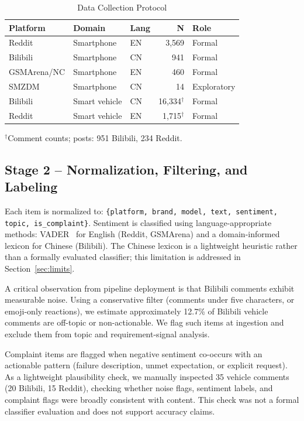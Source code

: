\documentclass[conference]{IEEEtran}
\begin{document}
\begin{table}[htb]
\caption{Data Collection Protocol}
\label{tab:collection}
\centering\small
\begin{tabular}{lllrl}
\toprule
Platform & Domain & Lang & N & Role \\
\midrule
Reddit       & Smartphone    & EN & 3,569  & Formal \\
Bilibili     & Smartphone    & CN & 941    & Formal \\
GSMArena/NC  & Smartphone    & EN & 460    & Formal \\
SMZDM        & Smartphone    & CN & 14     & Exploratory \\
Bilibili     & Smart vehicle & CN & 16,334$^\dagger$ & Formal \\
Reddit       & Smart vehicle & EN & 1,715$^\dagger$  & Formal \\
\bottomrule
\end{tabular}
\par\smallskip\footnotesize
$^\dagger$Comment counts; posts: 951 Bilibili, 234 Reddit.
\end{table}

\subsection{Stage 2 -- Normalization, Filtering, and Labeling}

Each item is normalized to: \texttt{\{platform, brand, model, text, sentiment, topic, is\_complaint\}}. Sentiment is classified using language-appropriate methods: VADER~\cite{Hutto2014} for English (Reddit, GSMArena) and a domain-informed lexicon for Chinese (Bilibili). The Chinese lexicon is a lightweight heuristic rather than a formally evaluated classifier; this limitation is addressed in Section~\ref{sec:limits}.

A critical observation from pipeline deployment is that Bilibili comments exhibit measurable noise. Using a conservative filter (comments under five characters, or emoji-only reactions), we estimate approximately 12.7\% of Bilibili vehicle comments are off-topic or non-actionable. We flag such items at ingestion and exclude them from topic and requirement-signal analysis.

Complaint items are flagged when negative sentiment co-occurs with an actionable pattern (failure description, unmet expectation, or explicit request). As a lightweight plausibility check, we manually inspected 35 vehicle comments (20 Bilibili, 15 Reddit), checking whether noise flags, sentiment labels, and complaint flags were broadly consistent with content. This check was not a formal classifier evaluation and does not support accuracy claims.
\end{document}
